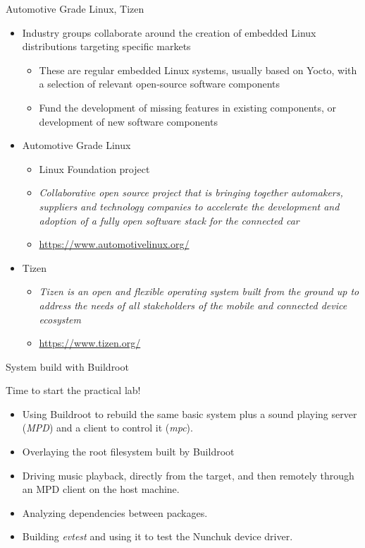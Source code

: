 \begin{frame}{Automotive Grade Linux, Tizen}
  \begin{itemize}
  \item Industry groups collaborate around the creation of embedded
    Linux distributions targeting specific markets
    \begin{itemize}
    \item These are regular embedded Linux systems, usually based on
      Yocto, with a selection of relevant open-source software components
    \item Fund the development of missing features in existing
      components, or development of new software components
    \end{itemize}
  \item Automotive Grade Linux
    \begin{itemize}
    \item Linux Foundation project
    \item {\em Collaborative open source project that is bringing
        together automakers, suppliers and technology companies to
        accelerate the development and adoption of a fully open
        software stack for the connected car}
    \item \url{https://www.automotivelinux.org/}
    \end{itemize}
  \item Tizen
    \begin{itemize}
    \item {\em Tizen is an open and flexible operating system built
        from the ground up to address the needs of all stakeholders of
        the mobile and connected device ecosystem}
    \item \url{https://www.tizen.org/}
    \end{itemize}
  \end{itemize}
\end{frame}

\setuplabframe
{System build with Buildroot}
{
  Time to start the practical lab!
  \begin{itemize}
  \item Using Buildroot to rebuild the same basic system plus a sound
    playing server ({\em MPD}) and a client to control it ({\em mpc}).
  \item Overlaying the root filesystem built by Buildroot
  \item Driving music playback, directly from the target, and then
    remotely through an MPD client on the host machine.
  \item Analyzing dependencies between packages.
  \item Building {\em evtest} and using it to test the Nunchuk
	device driver.
  \end{itemize}
}
